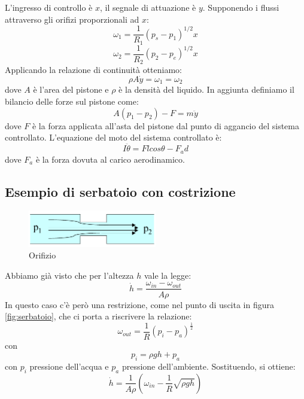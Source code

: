 \documentclass[a4paper]{report}
\begin{document}
L'ingresso di controllo \`e $x$, il segnale di attuazione \`e
$y$. Supponendo i flussi attraverso gli orifizi proporzionali ad $x$:
\[
  \omega_1 = \dfrac{1}{R_1} (p_s - p_1)^{1/2}x
\]
\[
  \omega_2 = \dfrac{1}{R_2} (p_2 - p_e)^{1/2}x
\]
Applicando la relazione di continuit\`a otteniamo:
\begin{equation}
  \rho A \dot{y} = \omega_1 = \omega_2
\end{equation}
dove $A$ \`e l'area del pistone e $\rho$ \`e la densit\`a del
liquido. In aggiunta definiamo il bilancio delle forze sul pistone
come:
\begin{equation}
  A (p_1 - p_2) - F = m \ddot{y}
\end{equation}
dove $F$ \`e la forza applicata all'asta del pistone dal punto di
aggancio del sistema controllato. L'equazione del moto del sistema
controllato \`e:
\begin{equation}
  I \ddot{\theta} = F l cos \theta - F_a d
\end{equation}
dove $F_a$ \`e la forza dovuta al carico aerodinamico.

\subsection{Esempio di serbatoio con costrizione}
\begin{figure}[!t]
\centering
\includegraphics[width=0.5\textwidth]{./images/orifizio.png}
\caption{Orifizio\label{fig:orifizio}}
\end{figure}
Abbiamo gi\`a visto che per l'altezza $h$ vale la legge:
\begin{equation}
  \dot{h} = \dfrac{\omega_{in} - \omega_{out}}{A \rho}
\end{equation}
In questo caso c'\`e per\`o una restrizione, come nel punto di uscita
in figura \ref{fig:serbatoio}, che ci porta a riscrivere
la relazione:
\begin{equation}
  \omega_{out} = \dfrac{1}{R} \left(p_i - p_a \right)^{\frac{1}{2}}
\end{equation}
con
\begin{equation}
  p_i = \rho g h + p_a
\end{equation}
con $p_i$ pressione dell'acqua e $p_a$ pressione
dell'ambiente. Sostituendo, si ottiene:
\begin{equation}
  \dot{h} = \dfrac{1}{A \rho} \left(\omega_{in} - \dfrac{1}{R}\sqrt{\rho g h}\right)
\end{equation}
\end{document}
